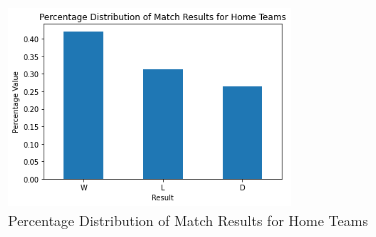 \begin{figure}[H]
    \centering
    \label{fig:home_advantage}
    \includegraphics[width=7.5cm]{chapter/4_implementation/section/2_data/section/figures/home_advantage.png}
    \captionsetup{justification=centering}
    \caption{Percentage Distribution of Match Results for Home Teams}
\end{figure}
